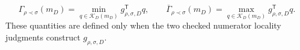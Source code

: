 \[
\Gamma_{\rho\prec\sigma}(m_D)
=\min_{q\in\mathcal K_D(m_D)}g_{\rho,\sigma,D}^{\mathsf T}q,
\qquad
\overline\Gamma_{\rho\prec\sigma}(m_D)
=\max_{q\in\mathcal K_D(m_D)}g_{\rho,\sigma,D}^{\mathsf T}q.
\]
These quantities are defined only when the two checked numerator locality judgments construct \(g_{\rho,\sigma,D}\).